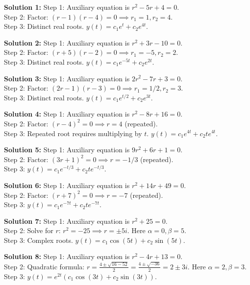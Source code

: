 \documentclass[11pt]{article}
\begin{document}
\textbf{Solution 1:} 
Step 1: Auxiliary equation is $r^2 - 5r + 4 = 0$. \\
Step 2: Factor: $(r - 1)(r - 4) = 0 \implies r_1 = 1, r_2 = 4$. \\
Step 3: Distinct real roots. $y(t) = c_1e^t + c_2e^{4t}$.

\textbf{Solution 2:} 
Step 1: Auxiliary equation is $r^2 + 3r - 10 = 0$. \\
Step 2: Factor: $(r + 5)(r - 2) = 0 \implies r_1 = -5, r_2 = 2$. \\
Step 3: Distinct real roots. $y(t) = c_1e^{-5t} + c_2e^{2t}$.

\textbf{Solution 3:} 
Step 1: Auxiliary equation is $2r^2 - 7r + 3 = 0$. \\
Step 2: Factor: $(2r - 1)(r - 3) = 0 \implies r_1 = 1/2, r_2 = 3$. \\
Step 3: Distinct real roots. $y(t) = c_1e^{t/2} + c_2e^{3t}$.

\textbf{Solution 4:} 
Step 1: Auxiliary equation is $r^2 - 8r + 16 = 0$. \\
Step 2: Factor: $(r - 4)^2 = 0 \implies r = 4$ (repeated). \\
Step 3: Repeated root requires multiplying by $t$. $y(t) = c_1e^{4t} + c_2te^{4t}$.

\textbf{Solution 5:} 
Step 1: Auxiliary equation is $9r^2 + 6r + 1 = 0$. \\
Step 2: Factor: $(3r + 1)^2 = 0 \implies r = -1/3$ (repeated). \\
Step 3: $y(t) = c_1e^{-t/3} + c_2te^{-t/3}$.

\textbf{Solution 6:} 
Step 1: Auxiliary equation is $r^2 + 14r + 49 = 0$. \\
Step 2: Factor: $(r + 7)^2 = 0 \implies r = -7$ (repeated). \\
Step 3: $y(t) = c_1e^{-7t} + c_2te^{-7t}$.

\textbf{Solution 7:} 
Step 1: Auxiliary equation is $r^2 + 25 = 0$. \\
Step 2: Solve for $r$: $r^2 = -25 \implies r = \pm 5i$. Here $\alpha = 0, \beta = 5$. \\
Step 3: Complex roots. $y(t) = c_1\cos(5t) + c_2\sin(5t)$.

\textbf{Solution 8:} 
Step 1: Auxiliary equation is $r^2 - 4r + 13 = 0$. \\
Step 2: Quadratic formula: $r = \frac{4 \pm \sqrt{16 - 52}}{2} = \frac{4 \pm \sqrt{-36}}{2} = 2 \pm 3i$. Here $\alpha = 2, \beta = 3$. \\
Step 3: $y(t) = e^{2t}(c_1\cos(3t) + c_2\sin(3t))$.
\end{document}
